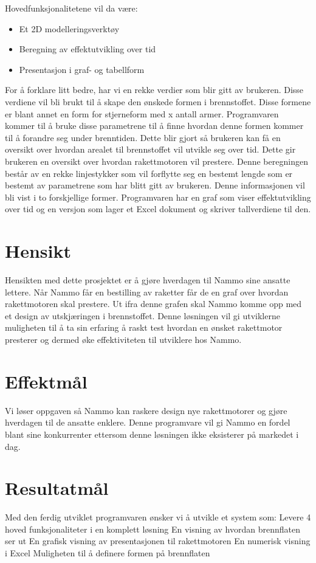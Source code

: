 Hovedfunksjonalitetene vil da være:
\begin{itemize}
    \item  Et 2D modelleringsverktøy
    \item Beregning av effektutvikling over tid
    \item  Presentasjon i graf- og tabellform
\end{itemize}
For å forklare litt bedre, har vi en rekke verdier som blir gitt av brukeren. Disse verdiene vil bli brukt til å skape den ønskede formen i brennstoffet. Disse formene er blant annet en form for stjerneform med  x antall armer. Programvaren kommer til å bruke disse parametrene til å finne hvordan denne formen kommer til å forandre seg under brenntiden. Dette blir gjort så brukeren kan få en oversikt over hvordan arealet til brennstoffet vil utvikle seg over tid. Dette gir brukeren en oversikt over hvordan rakettmotoren vil prestere. Denne beregningen består av en rekke linjestykker som vil forflytte seg en bestemt lengde som er bestemt av parametrene som har blitt gitt av brukeren. Denne informasjonen vil bli vist i to forskjellige former. Programvaren har en graf som viser effektutvikling over tid og en versjon som lager et Excel dokument og skriver tallverdiene til den.

\section{Hensikt}
Hensikten med dette prosjektet er å gjøre hverdagen til Nammo sine ansatte lettere. Når Nammo får en bestilling av raketter får de en graf over hvordan rakettmotoren skal prestere. Ut ifra denne grafen skal Nammo komme opp med et design av utskjæringen i brennstoffet. Denne løsningen vil gi utviklerne muligheten til å ta sin erfaring å raskt test hvordan en ønsket rakettmotor presterer og dermed øke effektiviteten til utviklere hos Nammo.

\section{Effektmål}
Vi løser oppgaven så Nammo kan raskere design nye rakettmotorer og gjøre hverdagen til de ansatte enklere. Denne programvare vil gi Nammo en fordel blant sine konkurrenter ettersom denne løsningen ikke eksisterer på markedet i dag.

\section{Resultatmål}
Med den ferdig utviklet programvaren ønsker vi å utvikle et system som:
Levere 4 hoved funksjonaliteter i en komplett løsning
	En visning av hvordan brennflaten ser ut
	En grafisk visning av presentasjonen til rakettmotoren
En numerisk visning i Excel
Muligheten til å definere formen på brennflaten


